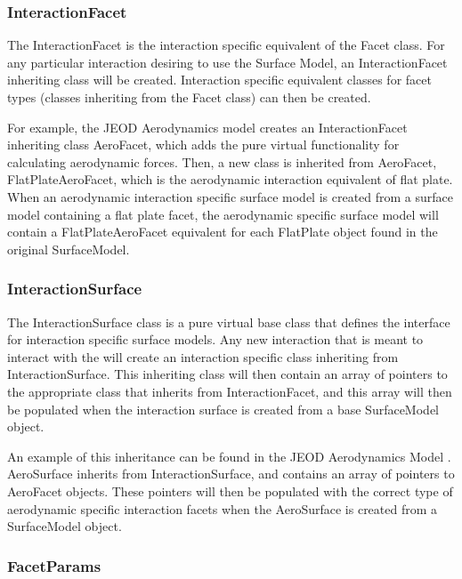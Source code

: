 \subsubsection{InteractionFacet}

The InteractionFacet is the interaction specific equivalent of the Facet class.
For any particular interaction desiring to use the Surface Model, an
InteractionFacet inheriting class will be created. Interaction specific
equivalent classes for facet types (classes inheriting from the Facet
class) can then be created.

For example, the JEOD Aerodynamics model
\cite{dynenv:AERODYNAMICS} creates an InteractionFacet inheriting class
AeroFacet, which adds the pure virtual functionality for calculating
aerodynamic forces. Then, a new class is inherited from AeroFacet,
FlatPlateAeroFacet, which is the aerodynamic interaction equivalent
of flat plate. When an aerodynamic interaction specific surface model
is created from a surface model containing a flat plate facet, the
aerodynamic specific surface model will contain a FlatPlateAeroFacet
equivalent for each FlatPlate object found in the original SurfaceModel.

\subsubsection{InteractionSurface}

The InteractionSurface class is a pure virtual base class that defines
the interface for interaction specific surface models.
Any new interaction that is meant to interact with the \ModelDesc will
create an interaction specific class inheriting from InteractionSurface.
This inheriting class will then contain an
array of pointers to the appropriate class that inherits from
InteractionFacet, and this array will then be populated when
the interaction surface is created from a base SurfaceModel
object.

An example of this inheritance can be found in the JEOD Aerodynamics
Model \cite{dynenv:AERODYNAMICS}. AeroSurface inherits from
InteractionSurface, and contains an array of pointers to
AeroFacet objects. These pointers will then be populated with
the correct type of aerodynamic specific interaction facets when
the AeroSurface is created from a SurfaceModel object.

\subsubsection{FacetParams}

